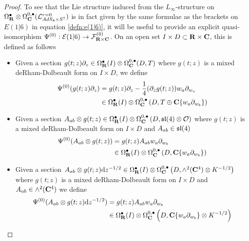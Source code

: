 \documentclass[../main.tex]{subfiles}
\begin{document}
\begin{proof}
To see that the Lie structure induced from the $L_\infty$-structure on $\Omega^\bullet_{\mathbf{R}}\otimes \Omega^{0,\bullet}_{\mathbf{C}} (\mathcal{L}^{r=0}_{AdS_4\times S^7} )$ is in fact given by the same formulae as the brackets on $E(1|6)$ in equation \ref{defn:e(1|6)}, it will be useful to provide an explicit quasi-isomorphism $\Psi^{(0)} : \mathcal{E}(1|6) \to \mathcal{F}^{(0)}_{\mathbf{R}\times \mathbf{C}}$. On an open set $I\times D\subset \mathbf{R}\times \mathbf{C}$, this is defined as follows

\begin{itemize}
\item Given a section $g(t; z) \partial_z \in \Omega^\bullet_{\mathbf{R}} (I)\otimes \Omega^{0,\bullet}_{\mathbf{C}} (D, T)$ where $g(t;z)$ is a mixed deRham-Dolbeault form on $I \times D$, we define
\begin{align*}
\Psi^{(0)} (g(t;z)\partial_z) &= g(t;z)\partial_z - \frac 14 (\partial_z g(t; z)) w_a\partial_{w_a} \\
&\in \Omega^\bullet_{\mathbf{R}} (I) \otimes \Omega^{0,\bullet}_{\mathbf{C}} \left ( D, T \oplus \mathbf{C}\{w_a\partial _{w_b} \} \right )
\end{align*}
\item Given a section $A_{ab} \otimes g(t; z) \in \Omega^\bullet_{\mathbf{R}} (I)\otimes \Omega^{0,\bullet}_{\mathbf{C}} \left (D, \mathfrak{sl}(4)\otimes \mathcal{O} \right )$ where $g(t;z)$ is a mixed deRham-Dolbeault form on $I \times D$ and $A_{ab}\in \mathfrak{sl}(4)$
\begin{align*}
\Psi^{(0)} (A_{ab} \otimes g(t;z)) &= g(t;z)A_{ab}w_a\partial_{w_b} \\
&\in \Omega^\bullet_{\mathbf{R}} (I) \otimes \Omega^{0,\bullet}_{\mathbf{C}} \left ( D, \mathbf{C}\{w_a\partial _{w_b}\} \right )
\end{align*}

\item Given a section $A_{ab} \otimes g(t; z)\mathrm{d} z^{-1/2} \in \Omega^\bullet_{\mathbf{R}} (I)\otimes \Omega^{0,\bullet}_{\mathbf{C}} \left (D, \wedge^2 (\mathbf{C}^4) \otimes K^{-1/2}\right )$
where $g(t;z)$ is a mixed deRham-Dolbeault form on $I\times D$ and $A_{ab} \in \wedge^2 (\mathbf{C}^4)$ we define
\begin{align*}
\Psi^{(0)} (A_{ab} \otimes g(t; z)\mathrm{d} z^{-1/2}) &= g(t;z)  A_{ab} w_a \partial_{w_b} \\
&\in \Omega^\bullet_{\mathbf{R}} (I) \otimes \Omega^{0,\bullet}_{\mathbf{C}} \left ( D, \mathbf{C}\{w_a\partial _{w_b} \}\otimes K^{-1/2} \right )
\end{align*}



\end{itemize}
\end{proof}
\end{document}
